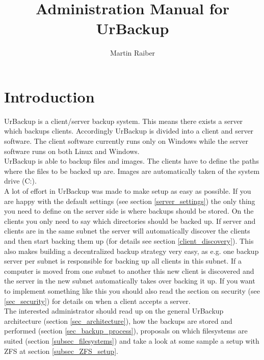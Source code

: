 \documentclass[a4paper,10pt]{article}
\begin{document}

\author{Martin Raiber}
\title{Administration Manual for UrBackup}

\maketitle

\tableofcontents

\section{Introduction}

UrBackup is a client/server backup system. This means there exists a server which backups clients. Accordingly UrBackup is divided into a client and server software. The client software currently runs only on Windows while the server software runs on both Linux and Windows.\\
UrBackup is able to backup files and images. The clients have to define the paths where the files to be backed up are. Images are automatically taken of the system drive (C:).\\
A lot of effort in UrBackup was made to make setup as easy as possible. If you are happy with the default settings (see section \ref{server_settings}) the only thing you need to define on the server side is where backups should be stored. On the clients you only need to say which directories should be backed up. If server and clients are in the same subnet the server will automatically discover the clients and then start backing them up (for details see section \ref{client_discovery}). This also makes building a decentralized backup strategy very easy, as e.g. one backup server per subnet is responsible for backing up all clients in this subnet. If a computer is moved from one subnet to another this new client is discovered and the server in the new subnet automatically takes over backing it up. If you want to implement something like this you should also read the section on security (see \ref{sec_security}) for details on when a client accepts a server.\\
The interested administrator should read up on the general UrBackup architecture (section \ref{sec_architecture}), how the backups are stored and performed (section \ref{sec_backup_process}), proposals on which filesystems are suited (section \ref{subsec_filesystems}) and take a look at some sample a setup with ZFS at section \ref{subsec_ZFS_setup}.
\end{document}
